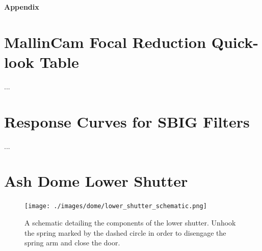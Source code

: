 \documentclass[12pt,titlepage]{article}
\begin{document}
\newpage
\begin{flushleft}
\textbf{\Large Appendix}
\end{flushleft}
\begin{appendix}

\setcounter{table}{0}   %
\renewcommand{\thetable}{\thesection\arabic{table}}  %
\setcounter{figure}{0}     %
\renewcommand{\thefigure}{\thesection\arabic{figure}}    %

\section{MallinCam Focal Reduction Quick-look Table}
...
\section{Response Curves for SBIG Filters}
...
\section{Ash Dome Lower Shutter}

\begin{figure}[H] 
	\begin{center}
		\texttt{[image: ./images/dome/lower\_shutter\_schematic.png]} 
		\label{azimuth_motor}
	\end{center}
	\caption{A schematic detailing the components of the lower shutter.
	Unhook the spring marked by the dashed circle in order to disengage the spring arm and close the door.}
	\label{apdx:lower_shutter}
\end{figure}


\end{appendix}


\newpage
\nocite{*}
{}	

\clearpage
\end{document}
